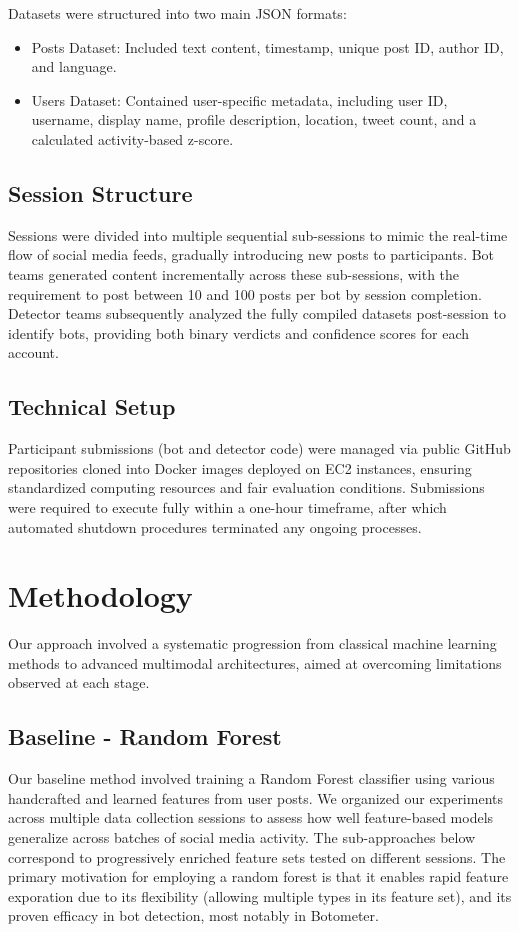 \documentclass[conference]{IEEEtran}
\begin{document}
Datasets were structured into two main JSON formats:
\begin{itemize}
    \item Posts Dataset: Included text content, timestamp, unique post ID, author ID, and language.
    
    \item Users Dataset: Contained user-specific metadata, including user ID, username, display name, profile description, location, tweet count, and a calculated activity-based z-score.
\end{itemize}

\subsection{Session Structure}

Sessions were divided into multiple sequential sub-sessions to mimic the real-time flow of social media feeds, gradually introducing new posts to participants. Bot teams generated content incrementally across these sub-sessions, with the requirement to post between 10 and 100 posts per bot by session completion. Detector teams subsequently analyzed the fully compiled datasets post-session to identify bots, providing both binary verdicts and confidence scores for each account.

\subsection{Technical Setup}

Participant submissions (bot and detector code) were managed via public GitHub repositories cloned into Docker images deployed on EC2 instances, ensuring standardized computing resources and fair evaluation conditions. Submissions were required to execute fully within a one-hour timeframe, after which automated shutdown procedures terminated any ongoing processes.




\section{Methodology}
Our approach involved a systematic progression from classical machine learning methods to advanced multimodal architectures, aimed at overcoming limitations observed at each stage.

\subsection{Baseline - Random Forest}
Our baseline method involved training a Random Forest classifier using various 
handcrafted and learned features from user posts. We organized our experiments across 
multiple data collection sessions to assess how well feature-based models generalize 
across batches of social media activity. The sub-approaches below correspond to progressively 
enriched feature sets tested on different sessions. The primary motivation
for employing a random forest is that it enables rapid feature exporation due to its
flexibility (allowing multiple types in its feature set), and its proven efficacy in bot detection,
most notably in Botometer.
\end{document}
